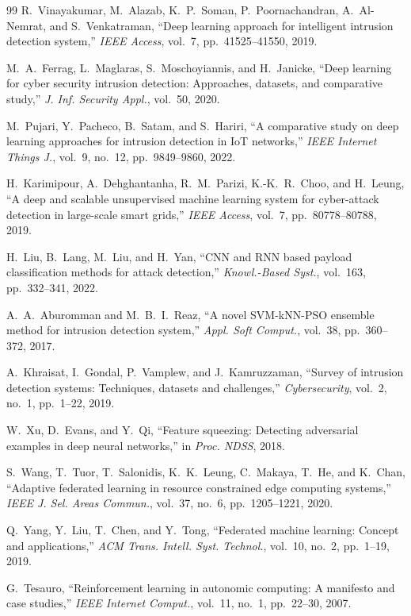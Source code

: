 \documentclass[journal,twoside]{IEEEtran}
\begin{document}
\begin{thebibliography}{99}
R.~Vinayakumar, M.~Alazab, K.~P.~Soman, P.~Poornachandran, A.~Al-Nemrat, and S.~Venkatraman, ``Deep learning approach for intelligent intrusion detection system,'' \emph{IEEE Access}, vol.~7, pp.~41525--41550, 2019.

M.~A.~Ferrag, L.~Maglaras, S.~Moschoyiannis, and H.~Janicke, ``Deep learning for cyber security intrusion detection: Approaches, datasets, and comparative study,'' \emph{J. Inf. Security Appl.}, vol.~50, 2020.

M.~Pujari, Y.~Pacheco, B.~Satam, and S.~Hariri, ``A comparative study on deep learning approaches for intrusion detection in IoT networks,'' \emph{IEEE Internet Things J.}, vol.~9, no.~12, pp.~9849--9860, 2022.

H.~Karimipour, A.~Dehghantanha, R.~M.~Parizi, K.-K.~R.~Choo, and H.~Leung, ``A deep and scalable unsupervised machine learning system for cyber-attack detection in large-scale smart grids,'' \emph{IEEE Access}, vol.~7, pp.~80778--80788, 2019.

H.~Liu, B.~Lang, M.~Liu, and H.~Yan, ``CNN and RNN based payload classification methods for attack detection,'' \emph{Knowl.-Based Syst.}, vol.~163, pp.~332--341, 2022.

A.~A.~Aburomman and M.~B.~I.~Reaz, ``A novel SVM-kNN-PSO ensemble method for intrusion detection system,'' \emph{Appl. Soft Comput.}, vol.~38, pp.~360--372, 2017.

A.~Khraisat, I.~Gondal, P.~Vamplew, and J.~Kamruzzaman, ``Survey of intrusion detection systems: Techniques, datasets and challenges,'' \emph{Cybersecurity}, vol.~2, no.~1, pp.~1--22, 2019.

W.~Xu, D.~Evans, and Y.~Qi, ``Feature squeezing: Detecting adversarial examples in deep neural networks,'' in \emph{Proc. NDSS}, 2018.

S.~Wang, T.~Tuor, T.~Salonidis, K.~K.~Leung, C.~Makaya, T.~He, and K.~Chan, ``Adaptive federated learning in resource constrained edge computing systems,'' \emph{IEEE J. Sel. Areas Commun.}, vol.~37, no.~6, pp.~1205--1221, 2020.

Q.~Yang, Y.~Liu, T.~Chen, and Y.~Tong, ``Federated machine learning: Concept and applications,'' \emph{ACM Trans. Intell. Syst. Technol.}, vol.~10, no.~2, pp.~1--19, 2019.

G.~Tesauro, ``Reinforcement learning in autonomic computing: A manifesto and case studies,'' \emph{IEEE Internet Comput.}, vol.~11, no.~1, pp.~22--30, 2007.

\end{thebibliography}
\end{document}
